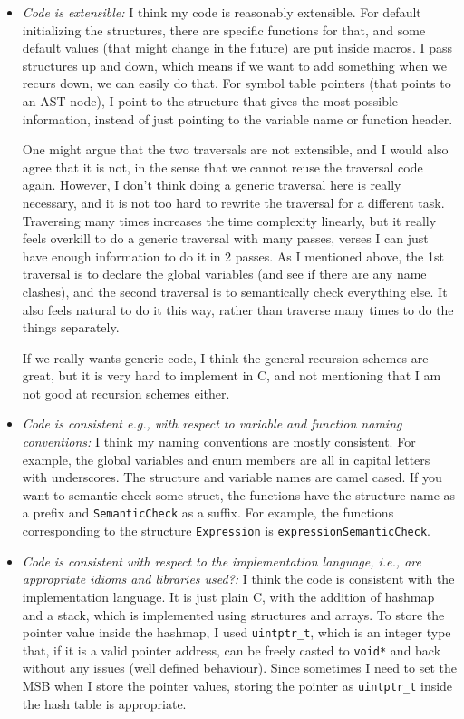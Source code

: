 \documentclass{article}
\begin{document}
\begin{itemize}
    \item \emph{Code is extensible:} 
        I think my code is reasonably extensible. For default initializing the structures, there are specific functions for that, and some default values (that might change in the future) are put inside macros. 
        I pass structures up and down, which means if we want to add something when we recurs down, we can easily do that. For symbol table pointers (that points to an AST node), I point to the structure that gives the most possible information, instead of just pointing to the variable name or function header.

        One might argue that the two traversals are not extensible, and I would also agree that it is not, in the sense that we cannot reuse the traversal code again. 
        However, I don't think doing a generic traversal here is really necessary, and it is not too hard to rewrite the traversal for a different task. Traversing many times increases the time complexity linearly, but it really feels overkill to do a generic traversal with many passes, verses I can just have enough information to do it in 2 passes. As I mentioned above, the 1st traversal is to declare the global variables (and see if there are any name clashes), and the second traversal is to semantically check everything else. It also feels natural to do it this way, rather than traverse many times to do the things separately.

        If we really wants generic code, I think the general recursion schemes are great, but it is very hard to implement in C, and not mentioning that I am not good at recursion schemes either.

    \item \emph{Code is consistent e.g., with respect to variable and function naming conventions:} I think my naming conventions are mostly consistent. For example, the global variables and enum members are all in capital letters with underscores. 
        The structure and variable names are camel cased.
        If you want to semantic check some struct, the functions have the structure name as a prefix and \verb|SemanticCheck| as a suffix.
        For example, the functions corresponding to the structure \verb|Expression| is \verb|expressionSemanticCheck|.
    \item \emph{Code is consistent with respect to the implementation language, i.e., are appropriate idioms and libraries used?:}
        I think the code is consistent with the implementation language. 
        It is just plain C, with the addition of hashmap and a stack, which is implemented using structures and arrays. 
        To store the pointer value inside the hashmap, I used \verb|uintptr_t|, which is an integer type that, if it is a valid pointer address, can be freely casted to \verb|void*| and back without any issues (well defined behaviour). Since sometimes I need to set the MSB when I store the pointer values, storing the pointer as \verb|uintptr_t| inside the hash table is appropriate.



\end{itemize}
\end{document}
